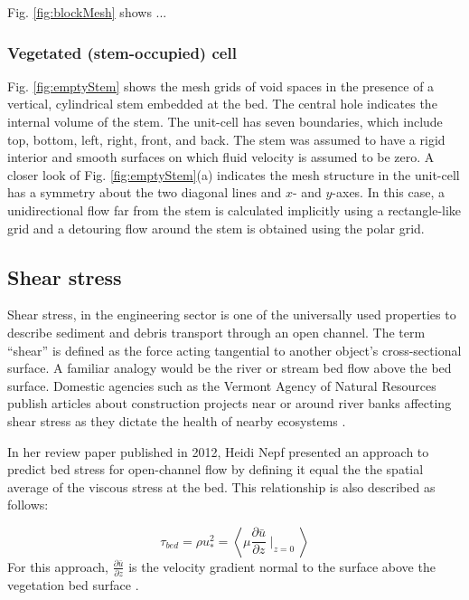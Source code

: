 Fig. \ref{fig:blockMesh} shows ... 

\subsubsection{Vegetated (stem-occupied) cell}

Fig. \ref{fig:emptyStem} shows the mesh grids of void spaces in the
presence of a vertical, cylindrical stem embedded at the bed. The
central hole indicates the internal volume of the stem. The unit-cell
has seven boundaries, which include top, bottom, left, right, front,
and back. The stem was assumed to have a rigid interior and smooth
surfaces on which fluid velocity is assumed to be zero. A closer look
of Fig. \ref{fig:emptyStem}(a) indicates the mesh structure in the
unit-cell has a symmetry about the two diagonal lines and $x$- and
$y$-axes. In this case, a unidirectional flow far from the stem is
calculated implicitly using a rectangle-like grid and a detouring
flow around the stem is obtained using the polar grid.

\subsection{Shear stress}

Shear stress, in the engineering sector is one of the universally
used properties to describe sediment and debris transport through
an open channel\citep{petit_dimensionless_2015}. The term ``shear''
is defined as the force acting tangential to another object\textquoteright s
cross-sectional surface. A familiar analogy would be the river or
stream bed flow above the bed surface. Domestic agencies such as the
Vermont Agency of Natural Resources publish articles about construction
projects near or around river banks affecting shear stress as they
dictate the health of nearby ecosystems \citep{natural_resources_sediment_2004}.

In her review paper published in 2012, Heidi Nepf presented an approach
to predict bed stress for open-channel flow by defining it equal the
the spatial average of the viscous stress at the bed. This relationship
is also described as follows:

\begin{equation}
\tau_{bed}=\rho u_{*}^{2}=\left\langle \mu\frac{\partial\bar{u}}{\partial z}\mid_{z=0}\right\rangle \text{}\label{eq:}
\end{equation}
For this approach, $\frac{\partial\bar{u}}{\partial z}$ is the velocity
gradient normal to the surface above the vegetation bed surface \citep{nepf_hydrodynamics_2012}.

